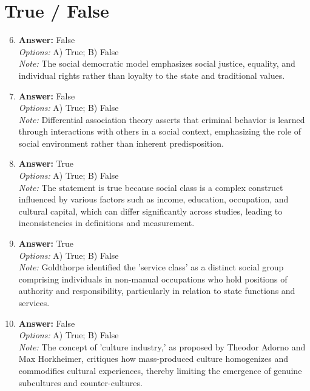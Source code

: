 \documentclass[12pt]{article}
\begin{document}
\section*{True / False}
\begin{enumerate}[label=\arabic*.]
\setcounter{enumi}{5}
\item \textbf{Answer:} False
\\ \textit{Options:} A) True; B) False
\\ \textit{Note:} The social democratic model emphasizes social justice, equality, and individual rights rather than loyalty to the state and traditional values.
\item \textbf{Answer:} False
\\ \textit{Options:} A) True; B) False
\\ \textit{Note:} Differential association theory asserts that criminal behavior is learned through interactions with others in a social context, emphasizing the role of social environment rather than inherent predisposition.
\item \textbf{Answer:} True
\\ \textit{Options:} A) True; B) False
\\ \textit{Note:} The statement is true because social class is a complex construct influenced by various factors such as income, education, occupation, and cultural capital, which can differ significantly across studies, leading to inconsistencies in definitions and measurement.
\item \textbf{Answer:} True
\\ \textit{Options:} A) True; B) False
\\ \textit{Note:} Goldthorpe identified the 'service class' as a distinct social group comprising individuals in non-manual occupations who hold positions of authority and responsibility, particularly in relation to state functions and services.
\item \textbf{Answer:} False
\\ \textit{Options:} A) True; B) False
\\ \textit{Note:} The concept of 'culture industry,' as proposed by Theodor Adorno and Max Horkheimer, critiques how mass-produced culture homogenizes and commodifies cultural experiences, thereby limiting the emergence of genuine subcultures and counter-cultures.
\end{enumerate}
\end{document}
